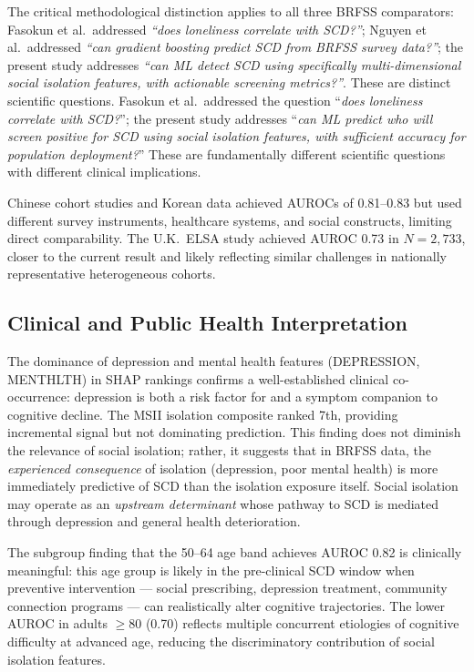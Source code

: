 \documentclass[12pt,a4paper]{article}
\begin{document}
The critical methodological distinction applies to all three BRFSS comparators:
Fasokun et al.\ addressed \textit{``does loneliness correlate with SCD?''};
Nguyen et al.\ addressed \textit{``can gradient boosting predict SCD from
BRFSS survey data?''}; the present study addresses \textit{``can ML detect SCD
using specifically multi-dimensional social isolation features, with actionable
screening metrics?''}. These are distinct scientific questions. Fasokun et al.\ addressed the question ``\textit{does
loneliness correlate with SCD?}''; the present study addresses ``\textit{can ML
predict who will screen positive for SCD using social isolation features, with
sufficient accuracy for population deployment?}'' These are fundamentally
different scientific questions with different clinical implications.

Chinese cohort studies \cite{Wang2022,Hu2021} and Korean data \cite{Oh2024}
achieved AUROCs of 0.81--0.83 but used different survey instruments, healthcare
systems, and social constructs, limiting direct comparability. The U.K.\ ELSA
study \cite{Ahmadzadeh2023} achieved AUROC 0.73 in $N = 2{,}733$, closer to
the current result and likely reflecting similar challenges in nationally
representative heterogeneous cohorts.

\subsection{Clinical and Public Health Interpretation}

The dominance of depression and mental health features (DEPRESSION, MENTHLTH)
in SHAP rankings confirms a well-established clinical co-occurrence: depression
is both a risk factor for and a symptom companion to cognitive decline. The
MSII isolation composite ranked 7th, providing incremental signal but not
dominating prediction. This finding does not diminish the relevance of social
isolation; rather, it suggests that in BRFSS data, the \textit{experienced
consequence} of isolation (depression, poor mental health) is more immediately
predictive of SCD than the isolation exposure itself. Social isolation may
operate as an \textit{upstream determinant} whose pathway to SCD is mediated
through depression and general health deterioration.

The subgroup finding that the 50--64 age band achieves AUROC 0.82 is clinically
meaningful: this age group is likely in the pre-clinical SCD window when
preventive intervention --- social prescribing, depression treatment, community
connection programs --- can realistically alter cognitive trajectories. The
lower AUROC in adults $\geq$80 (0.70) reflects multiple concurrent etiologies
of cognitive difficulty at advanced age, reducing the discriminatory contribution
of social isolation features.
\end{document}
